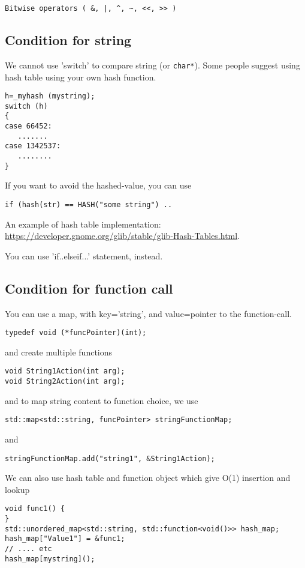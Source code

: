 \begin{verbatim}
Bitwise operators ( &, |, ^, ~, <<, >> )
\end{verbatim}

\subsection{Condition for string}

We cannot use 'switch' to compare string (or \verb!char*!). Some people
suggest using hash table using your own hash function. 
\begin{verbatim}
h=_myhash (mystring);
switch (h)
{
case 66452:
   .......
case 1342537:
   ........
}
\end{verbatim}
If you want to avoid the hashed-value, you can use
\begin{verbatim}
if (hash(str) == HASH("some string") ..
\end{verbatim}
An example of hash table implementation:
\url{https://developer.gnome.org/glib/stable/glib-Hash-Tables.html}.

You can use 'if..elseif...' statement, instead.


\subsection{Condition for function call}

You can use a map, with key='string', and value=pointer to the function-call.

\begin{verbatim}
typedef void (*funcPointer)(int);
\end{verbatim}
and create multiple functions
\begin{verbatim}
void String1Action(int arg);
void String2Action(int arg);
\end{verbatim}
and to map string content to function choice, we use
\begin{verbatim}
std::map<std::string, funcPointer> stringFunctionMap;
\end{verbatim}
and
\begin{verbatim}
stringFunctionMap.add("string1", &String1Action);
\end{verbatim}

We can also use hash table and function object which give O(1) insertion and
lookup
\begin{verbatim}
void func1() {
}
std::unordered_map<std::string, std::function<void()>> hash_map;
hash_map["Value1"] = &func1;
// .... etc
hash_map[mystring]();
\end{verbatim}

